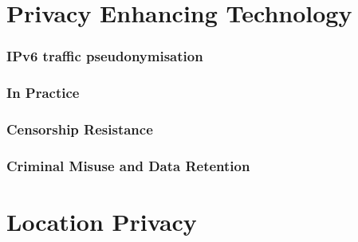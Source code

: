 \documentclass{article}
\author{Leopold Lemmermann}
\begin{document}
\createtitle

\part{Privacy Enhancing Technology}
% 

\section{IPv6 traffic pseudonymisation}

\section{In Practice}

\section{Censorship Resistance}

\section{Criminal Misuse and Data Retention}



\part{Location Privacy}
\end{document}
